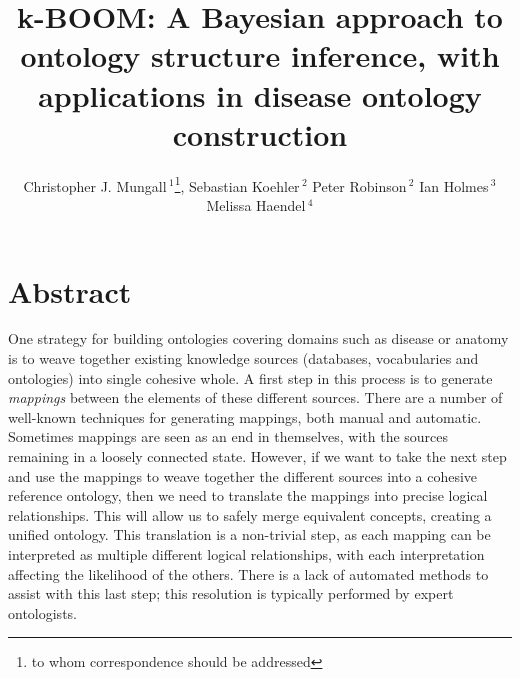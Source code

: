 \documentclass{my}
\begin{document}

\title{k-BOOM: A Bayesian approach to ontology structure inference, with applications in disease ontology construction}

\author{Christopher J. Mungall\,$^{1}$\footnote{to whom correspondence should be addressed},
  Sebastian Koehler\,$^{2}$
  Peter Robinson\,$^{2}$
  Ian Holmes\,$^{3}$
  Melissa Haendel\,$^{4}$
}
\address{
  $^{1}$Environmental Genomics and Systems Biology Division, Lawrence Berkeley National Laboratory, MS977, 1 Cyclotron Road, Berkeley, CA 94720 USA\\
  $^{2}$Institute for Medical and Human Genetics, Charit\'{e}-Universit\"atsmedizin Berlin, Augustenburger Platz 1, 13353 Berlin, Germany. \\
  $^{3}$Department of Bioengineering, University of California, Berkeley, CA, USA \\
  $^{4}$Department of Medical Informatics \& Clinical Epidemiology, Oregon Health and Sciences University, Portland, Oregon, USA
}

\history{}

\editor{}

\maketitle

\section{Abstract}

One strategy for building ontologies covering domains such as disease
or anatomy is to weave together existing knowledge sources (databases,
vocabularies and ontologies) into single cohesive whole. A first step
in this process is to generate \emph{mappings} between the elements of
these different sources. There are a number of well-known techniques
for generating mappings, both manual and automatic. Sometimes mappings
are seen as an end in themselves, with the sources remaining in a
loosely connected state. However, if we want to take the next step and
use the mappings to weave together the different sources into a
cohesive reference ontology, then we need to translate the mappings
into precise logical relationships. This will allow us to safely merge
equivalent concepts, creating a unified ontology. This translation is
a non-trivial step, as each mapping can be interpreted as multiple
different logical relationships, with each interpretation affecting
the likelihood of the others. There is a lack of automated methods to
assist with this last step; this resolution is typically performed by
expert ontologists.
\end{document}
